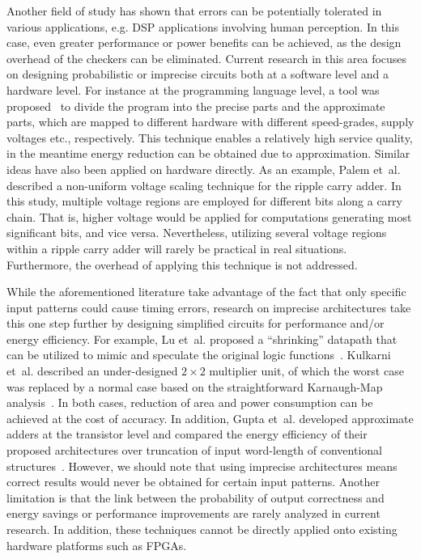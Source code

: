 \documentclass[prodmode,acmtrets]{acmsmall} %
\begin{document}
Another field of study has shown that errors can be potentially tolerated in various applications, e.g. DSP applications involving human perception. In this case, even greater performance or power benefits can be achieved, as the design overhead of the checkers can be eliminated. Current research in this area focuses on designing probabilistic or imprecise circuits both at a software level and a hardware level. For instance at the programming language level, a tool was proposed~\cite{EnerJ2011Uwash,Truffle2012Uwash} to divide the program into the precise parts and the approximate parts, which are mapped to different hardware with different speed-grades, supply voltages etc., respectively. This technique enables a relatively high service quality, in the meantime energy reduction can be obtained due to approximation. Similar ideas have also been applied on hardware directly. As an example, Palem et~al.~\cite{NonUniformScaling} described a non-uniform voltage scaling technique for the ripple carry adder. In this study, multiple voltage regions are employed for different bits along a carry chain. That is, higher voltage would be applied for computations generating most significant bits, and vice versa. Nevertheless, utilizing several voltage regions within a ripple carry adder will rarely be practical in real situations. Furthermore, the overhead of applying this technique is not addressed.

While the aforementioned literature take advantage of the fact that only specific input patterns could cause timing errors, research on imprecise architectures take this one step further by designing simplified circuits for performance and/or energy efficiency. For example, Lu et~al. proposed a ``shrinking'' datapath that can be utilized to mimic and speculate the original logic functions~\cite{IntelSpeeding}. Kulkarni et~al. described an under-designed $2\times2$ multiplier unit, of which the worst case was replaced by a normal case based on the straightforward Karnaugh-Map analysis~\cite{Undersigned2x2multiplier}. In both cases, reduction of area and power consumption can be achieved at the cost of accuracy. In addition, Gupta et~al. developed approximate adders at the transistor level and compared the energy efficiency of their proposed architectures over truncation of input word-length of conventional structures~\cite{Gupta2013TransCADICS}. However, we should note that using imprecise architectures means correct results would never be obtained for certain input patterns. Another limitation is that the link between the probability of output correctness and energy savings or performance improvements are rarely analyzed in current research. In addition, these techniques cannot be directly applied onto existing hardware platforms such as FPGAs.
\end{document}
